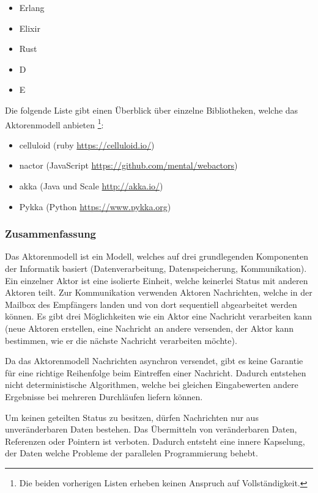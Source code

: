 \begin{itemize}
  \item Erlang
  \item Elixir
  \item Rust
  \item D
  \item E
\end{itemize}

Die folgende Liste gibt einen Überblick über einzelne Bibliotheken, welche das Aktorenmodell anbieten \footnote{Die beiden vorherigen Listen erheben keinen Anspruch auf Vollständigkeit.}:

\begin{itemize}
  \item celluloid (ruby \url{https://celluloid.io/})
  \item nactor (JavaScript \url{https://github.com/mental/webactors})
  \item akka (Java und Scale \url{http://akka.io/})
  \item Pykka (Python \url{https://www.pykka.org})
\end{itemize}

\subsubsection{Zusammenfassung}
Das Aktorenmodell ist ein Modell, welches auf drei grundlegenden Komponenten der Informatik basiert (Datenverarbeitung, Datenspeicherung, Kommunikation). Ein einzelner Aktor ist eine isolierte Einheit, welche keinerlei Status mit anderen Aktoren teilt. Zur Kommunikation verwenden Aktoren Nachrichten, welche in der Mailbox des Empfängers landen und von dort sequentiell abgearbeitet werden können. Es gibt drei Möglichkeiten wie ein Aktor eine Nachricht verarbeiten kann (neue Aktoren erstellen, eine Nachricht  an andere versenden, der Aktor kann bestimmen, wie er die nächste Nachricht verarbeiten möchte).

Da das Aktorenmodell Nachrichten asynchron versendet, gibt es keine Garantie für eine richtige Reihenfolge beim Eintreffen einer Nachricht. Dadurch entstehen nicht deterministische Algorithmen, welche bei gleichen Eingabewerten andere Ergebnisse bei mehreren Durchläufen liefern können. 

Um keinen geteilten Status zu besitzen, dürfen Nachrichten nur aus unveränderbaren Daten bestehen. Das Übermitteln von veränderbaren Daten, Referenzen oder Pointern ist verboten. Dadurch entsteht eine innere Kapselung, der Daten welche Probleme der parallelen Programmierung behebt.